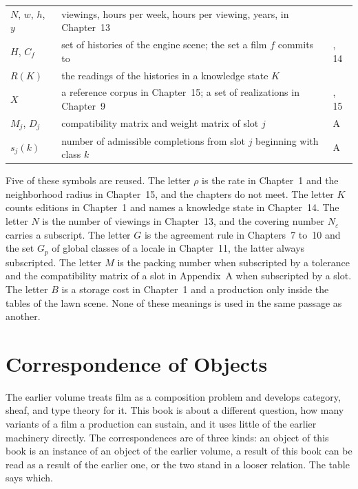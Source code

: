 \documentclass[11pt,twoside,openright]{book}
\theoremstyle{plain}
\theoremstyle{definition}
\theoremstyle{remark}
\begin{document}
\begin{longtable}{@{}>{\raggedright\arraybackslash}p{2.6cm}>{\raggedright\arraybackslash}p{8.4cm}>{\raggedright\arraybackslash}p{1.6cm}@{}}
$N$, $w$, $h$, $y$ & viewings, hours per week, hours per viewing, years, in Chapter~13 & 13\\
$H$, $C_f$ & set of histories of the engine scene; the set a film $f$ commits to & 3, 14\\
$R(K)$ & the readings of the histories in a knowledge state $K$ & 14\\
$X$ & a reference corpus in Chapter~15; a set of realizations in Chapter~9 & 9, 15\\
$M_j$, $D_j$ & compatibility matrix and weight matrix of slot $j$ & A\\
$s_j(k)$ & number of admissible completions from slot $j$ beginning with class $k$ & A\\
\end{longtable}

Five of these symbols are reused. The letter $\rho$ is the rate in Chapter~1 and the neighborhood radius in Chapter~15, and the chapters do not meet. The letter $K$ counts editions in Chapter~1 and names a knowledge state in Chapter~14. The letter $N$ is the number of viewings in Chapter~13, and the covering number $N_\varepsilon$ carries a subscript. The letter $G$ is the agreement rule in Chapters~7 to~10 and the set $G_p$ of global classes of a locale in Chapter~11, the latter always subscripted. The letter $M$ is the packing number when subscripted by a tolerance and the compatibility matrix of a slot in Appendix~A when subscripted by a slot. The letter $B$ is a storage cost in Chapter~1 and a production only inside the tables of the lawn scene. None of these meanings is used in the same passage as another.

\section{Correspondence of Objects}\label{sec:corr}

The earlier volume treats film as a composition problem and develops category, sheaf, and type theory for it. This book is about a different question, how many variants of a film a production can sustain, and it uses little of the earlier machinery directly. The correspondences are of three kinds: an object of this book is an instance of an object of the earlier volume, a result of this book can be read as a result of the earlier one, or the two stand in a looser relation. The table says which.
\end{document}
